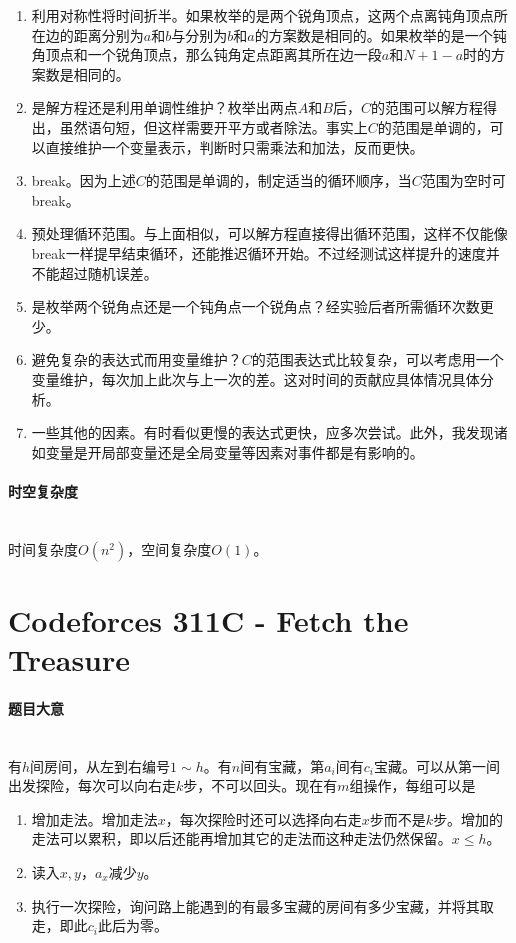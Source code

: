 \documentclass[UTF8]{ctexart}
\newcommand{\myparagraph}[1]{\paragraph{#1}\mbox{}\\}
\theoremstyle{nonumberplain}
\begin{document}
			\begin{enumerate}
				\item 利用对称性将时间折半。如果枚举的是两个锐角顶点，这两个点离钝角顶点所在边的距离分别为$a$和$b$与分别为$b$和$a$的方案数是相同的。如果枚举的是一个钝角顶点和一个锐角顶点，那么钝角定点距离其所在边一段$a$和$N+1-a$时的方案数是相同的。
				\item 是解方程还是利用单调性维护？枚举出两点$A$和$B$后，$C$的范围可以解方程得出，虽然语句短，但这样需要开平方或者除法。事实上$C$的范围是单调的，可以直接维护一个变量表示，判断时只需乘法和加法，反而更快。
				\item break。因为上述$C$的范围是单调的，制定适当的循环顺序，当$C$范围为空时可break。
				\item 预处理循环范围。与上面相似，可以解方程直接得出循环范围，这样不仅能像break一样提早结束循环，还能推迟循环开始。不过经测试这样提升的速度并不能超过随机误差。
				\item 是枚举两个锐角点还是一个钝角点一个锐角点？经实验后者所需循环次数更少。
				\item 避免复杂的表达式而用变量维护？$C$的范围表达式比较复杂，可以考虑用一个变量维护，每次加上此次与上一次的差。这对时间的贡献应具体情况具体分析。
				\item 一些其他的因素。有时看似更慢的表达式更快，应多次尝试。此外，我发现诸如变量是开局部变量还是全局变量等因素对事件都是有影响的。
				
			\end{enumerate}
		
		\myparagraph{时空复杂度}
		
			时间复杂度$O(n^2)$，空间复杂度$O(1)$。
	
	\section{Codeforces 311C - Fetch the Treasure}
	
		\myparagraph{题目大意}
		
			有$h$间房间，从左到右编号$1 \sim h$。有$n$间有宝藏，第$a_i$间有$c_i$宝藏。可以从第一间出发探险，每次可以向右走$k$步，不可以回头。现在有$m$组操作，每组可以是
			
			\begin{enumerate}
				\item 增加走法。增加走法$x$，每次探险时还可以选择向右走$x$步而不是$k$步。增加的走法可以累积，即以后还能再增加其它的走法而这种走法仍然保留。$x \leq h$。
				\item 读入$x,y$，$a_x$减少$y$。
				\item 执行一次探险，询问路上能遇到的有最多宝藏的房间有多少宝藏，并将其取走，即此$c_i$此后为零。
			\end{enumerate}
			
\end{document}

